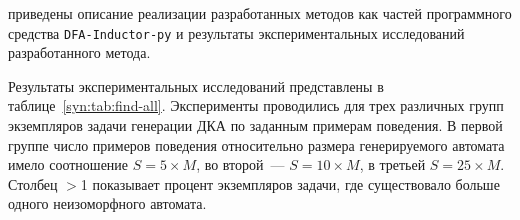 \insection{\ref{sec:findall:results}} приведены описание реализации разработанных методов как частей программного средства \texttt{DFA-Inductor-py} и результаты экспериментальных исследований разработанного метода. 

Результаты экспериментальных исследований представлены в таблице~\ref{syn:tab:find-all}.
Эксперименты проводились для трех различных групп экземпляров задачи генерации ДКА по заданным примерам поведения.
В первой группе число примеров поведения относительно размера генерируемого автомата имело соотношение $S = 5 \times M$,
во второй~--- $S = 10 \times M$, в третьей $S = 25 \times M$.
Столбец $>$1 показывает процент экземпляров задачи, где существовало больше одного неизоморфного автомата.

\begin{table}
  \centering
  \caption{Медианное время нахождения всех различных ДКА с помощью метода на основе сведения к SAT с перезапуском программного средства (REST), метода на основе сведения к SAT с использованием инкрементального программного средства (INC) и переборного метода с возвратами (BTR)}
\end{table}
